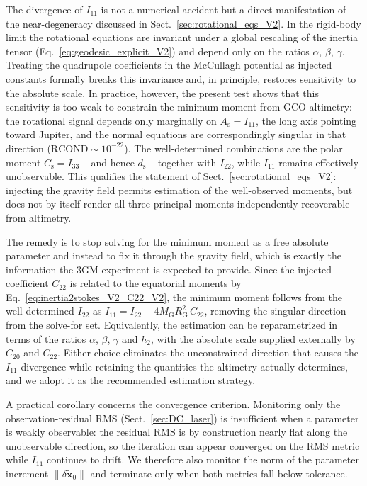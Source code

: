 \documentclass[lineno, pdflatex,sn-mathphys-ay]{sn-jnl}
\theoremstyle{thmstyleone}%
\theoremstyle{thmstyletwo}%
\theoremstyle{thmstylethree}%
\renewcommand{\vec}[1]{\boldsymbol{#1}}
\begin{document}
The divergence of $I_{11}$ is not a numerical accident but a direct manifestation of the near-degeneracy discussed in Sect.~\ref{sec:rotational_eqs_V2}. In the rigid-body limit the rotational equations are invariant under a global rescaling of the inertia tensor (Eq.~\ref{eq:geodesic_explicit_V2}) and depend only on the ratios $\alpha$, $\beta$, $\gamma$. Treating the quadrupole coefficients in the McCullagh potential as injected constants formally breaks this invariance and, in principle, restores sensitivity to the absolute scale. In practice, however, the present test shows that this sensitivity is too weak to constrain the minimum moment from GCO altimetry: the rotational signal depends only marginally on $A_{\mathrm{s}} = I_{11}$, the long axis pointing toward Jupiter, and the normal equations are correspondingly singular in that direction ($\mathrm{RCOND}\sim 10^{-22}$). The well-determined combinations are the polar moment $C_{\mathrm{s}} = I_{33}$ -- and hence $d_{\mathrm{s}}$ -- together with $I_{22}$, while $I_{11}$ remains effectively unobservable. This qualifies the statement of Sect.~\ref{sec:rotational_eqs_V2}: injecting the gravity field permits estimation of the well-observed moments, but does not by itself render all three principal moments independently recoverable from altimetry.

The remedy is to stop solving for the minimum moment as a free absolute parameter and instead to fix it through the gravity field, which is exactly the information the 3GM experiment is expected to provide. Since the injected coefficient $C_{22}$ is related to the equatorial moments by Eq.~\eqref{eq:inertia2stokes_V2_C22_V2}, the minimum moment follows from the well-determined $I_{22}$ as $I_{11} = I_{22} - 4 {M}_{\mathrm{G}} R_{\mathrm{G}}^2\, C_{22}$, removing the singular direction from the solve-for set. Equivalently, the estimation can be reparametrized in terms of the ratios $\alpha$, $\beta$, $\gamma$ and $h_2$, with the absolute scale supplied externally by $C_{20}$ and $C_{22}$. Either choice eliminates the unconstrained direction that causes the $I_{11}$ divergence while retaining the quantities the altimetry actually determines, and we adopt it as the recommended estimation strategy.

A practical corollary concerns the convergence criterion. Monitoring only the observation-residual RMS (Sect.~\ref{sec:DC_laser}) is insufficient when a parameter is weakly observable: the residual RMS is by construction nearly flat along the unobservable direction, so the iteration can appear converged on the RMS metric while $I_{11}$ continues to drift. We therefore also monitor the norm of the parameter increment $\|\delta\tilde{\vec x}_0\|$ and terminate only when both metrics fall below tolerance.
\end{document}
